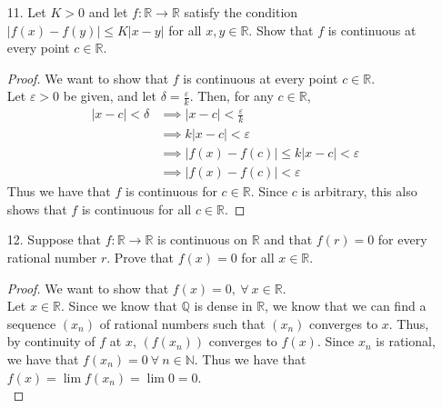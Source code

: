 \documentclass[12pt,letterpaper]{article}
\newcommand{\R}{\mathbb{R}}
\newcommand{\N}{\mathbb{N}}
\newcommand{\Q}{\mathbb{Q}}
\theoremstyle{case}
\theoremstyle{definition}
\begin{document}
\begin{enumerate}
\begin{enumerate}
			\item[11.] Let $K>0$ and let $f:\R \to \R$ satisfy the condition $|f(x)-f(y)|\leq K|x-y|$ for all $x,y \in \R$. Show that $f$ is continuous at every point $c \in \R$.\\
			
			\begin{proof}
				We want to show that $f$ is continuous at every point $c \in \R$.\\
				
				Let $\varepsilon >0$ be given, and let $\delta = \frac{\varepsilon}{k}$. Then, for any $c \in \R$,
				\begin{align*}
					|x-c|<\delta &\implies |x-c|<\frac{\varepsilon}{k} \\
					&\implies k|x-c| < \varepsilon \\
					&\implies |f(x)-f(c)| \leq k|x-c|<\varepsilon \\
					&\implies |f(x)-f(c)|<\varepsilon
				\end{align*}
				Thus we have that $f$ is continuous for $c \in \R$. Since $c$ is arbitrary, this also shows that $f$ is continuous for all $c \in \R$.
			\end{proof}

			\item[12.] Suppose that $f:\R \to \R$ is continuous on $\R$ and that $f(r)=0$ for every rational number $r$. Prove that $f(x)=0$ for all $x \in \R$.\\
			
			\begin{proof}
				We want to show that $f(x)=0,\ \forall\ x \in \R$.\\
				
				Let $x \in \R$. Since we know that $\Q$ is dense in $\R$, we know that we can find a sequence $(x_n)$ of rational numbers such that $(x_n)$ converges to $x$. Thus, by continuity of $f$ at $x$, $(f(x_n))$ converges to $f(x)$. Since $x_n$ is rational, we have that $f(x_n)=0\ \forall\ n \in \N$. Thus we have that $f(x) = \lim f(x_n) = \lim 0 = 0$.\\
				

\end{proof}
\end{enumerate}
\end{enumerate}
\end{document}
